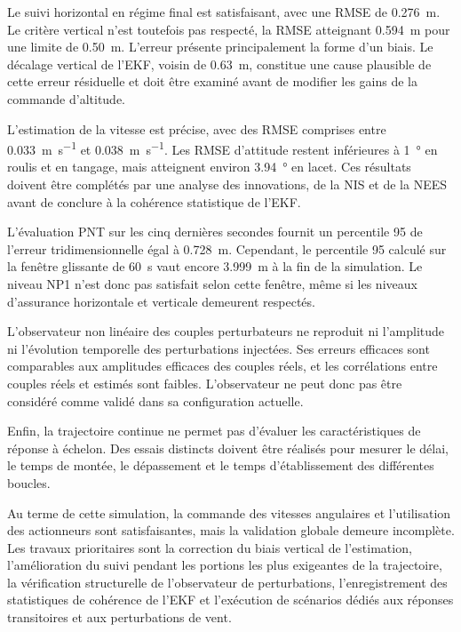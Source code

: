 \documentclass[11pt,a4paper,oneside]{report}
\begin{document}
Le suivi horizontal en régime final est satisfaisant, avec une RMSE de \SI{0.276}{m}. Le critère vertical n'est toutefois pas respecté, la RMSE atteignant \SI{0.594}{m} pour une limite de \SI{0.50}{m}. L'erreur présente principalement la forme d'un biais. Le décalage vertical de l'EKF, voisin de \SI{0.63}{m}, constitue une cause plausible de cette erreur résiduelle et doit être examiné avant de modifier les gains de la commande d'altitude.

L'estimation de la vitesse est précise, avec des RMSE comprises entre \SI{0.033}{m.s^{-1}} et \SI{0.038}{m.s^{-1}}. Les RMSE d'attitude restent inférieures à \SI{1}{\degree} en roulis et en tangage, mais atteignent environ \SI{3.94}{\degree} en lacet. Ces résultats doivent être complétés par une analyse des innovations, de la NIS et de la NEES avant de conclure à la cohérence statistique de l'EKF.

L'évaluation PNT sur les cinq dernières secondes fournit un percentile 95 de l'erreur tridimensionnelle égal à \SI{0.728}{m}. Cependant, le percentile 95 calculé sur la fenêtre glissante de \SI{60}{s} vaut encore \SI{3.999}{m} à la fin de la simulation. Le niveau NP1 n'est donc pas satisfait selon cette fenêtre, même si les niveaux d'assurance horizontale et verticale demeurent respectés.

L'observateur non linéaire des couples perturbateurs ne reproduit ni l'amplitude ni l'évolution temporelle des perturbations injectées. Ses erreurs efficaces sont comparables aux amplitudes efficaces des couples réels, et les corrélations entre couples réels et estimés sont faibles. L'observateur ne peut donc pas être considéré comme validé dans sa configuration actuelle.

Enfin, la trajectoire continue ne permet pas d'évaluer les caractéristiques de réponse à échelon. Des essais distincts doivent être réalisés pour mesurer le délai, le temps de montée, le dépassement et le temps d'établissement des différentes boucles.

Au terme de cette simulation, la commande des vitesses angulaires et l'utilisation des actionneurs sont satisfaisantes, mais la validation globale demeure incomplète. Les travaux prioritaires sont la correction du biais vertical de l'estimation, l'amélioration du suivi pendant les portions les plus exigeantes de la trajectoire, la vérification structurelle de l'observateur de perturbations, l'enregistrement des statistiques de cohérence de l'EKF et l'exécution de scénarios dédiés aux réponses transitoires et aux perturbations de vent.
	
	\printbibliography[heading=bibintoc,title={Références}]
	
\end{document}
